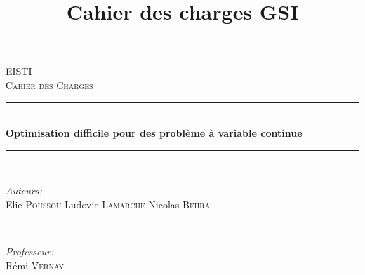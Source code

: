 \documentclass[12pt]{article}
\title{Cahier des charges GSI}
\begin{document}
\begin{titlepage}

\newcommand{\HRule}{\rule{\linewidth}{0.5mm}} %

\center %
 

\textsc{\LARGE EISTI}\\[1.2cm] %
\textsc{\Large Cahier des Charges}\\[0.5cm] %


\HRule \\[0.4cm]
{ \huge \bfseries Optimisation difficile pour des problème à variable continue}\\[0.4cm] %
\HRule \\[1.5cm]
 

\begin{minipage}{0.4\textwidth}
\begin{flushleft} \large
\emph{Auteurs:}\\
Elie \textsc{Poussou}
Ludovic \textsc{Lamarche}
Nicolas \textsc{Behra}
\end{flushleft}
\end{minipage}
~
\begin{minipage}{0.4\textwidth}
\begin{flushright} \large
\emph{Professeur:} \\
Rémi \textsc{Vernay} %
\end{flushright}
\end{minipage}\\[2cm]



\end{titlepage}
\end{document}
